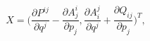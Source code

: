 \begin{equation}
  X = \bigg(
   \frac{\partial P^{ij}}{\partial q^j} - \frac{\partial A^i_j}{\partial p_j},
   \frac{\partial A^j_i}{\partial q^j} + \frac{\partial Q_{ij}}{\partial p_j}
  \bigg)^T,
\end{equation}

